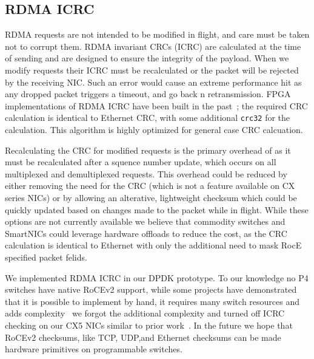 \subsection{RDMA ICRC}
\label{sec:appendix_icrc}

RDMA requests are not intended to be modified in flight, and care must
be taken not to corrupt them. RDMA invariant CRCs (ICRC) are
calculated at the time of sending and are designed to ensure the
integrity of the payload. When we modify requests their ICRC must be
recalculated or the packet will be rejected by the receiving NIC. Such
an error would cause an extreme performance hit as any dropped packet
triggers a timeout, and go back n retransmission.  FPGA
implementations of RDMA ICRC have been built in the
past~\cite{Mansour_2019}; the required CRC calculation is identical to
Ethernet CRC, with some additional \texttt{crc32} for the
calculation. This algorithm is highly optimized for general case CRC
calcuation.

Recalculating the CRC for modified requests is the primary overhead of {\sword}
as it must be recalculated after a squence number update, which occurs on all
multiplexed and demultiplexed requests. This overhead could be reduced by either
removing the need for the CRC (which is not a feature available on CX series
NICs) or by allowing an alterative, lightweight checksum which could be quickly
updated based on changes made to the packet while in flight. While these options
are not currently available we believe that commodity switches and SmartNICs
could leverage hardware offloads to reduce the cost, as the CRC calculation is
identical to Ethernet with only the additional need to mask RocE specified
packet felids.

We implemented RDMA ICRC in our DPDK prototype. To our knowledge no P4 switches
have native RoCEv2 support, while some projects have demonstrated that it is
possible to implement by hand, it requires many switch resources and adds
complexity~\cite{p4-telem} we forgot the additional complexity and turned off
ICRC checking on our CX5 NICs similar to prior work~\cite{switchml}. In the
future we hope that RoCEv2 checksums, like TCP, UDP,and Ethernet checksums can
be made hardware primitives on programmable switches.

